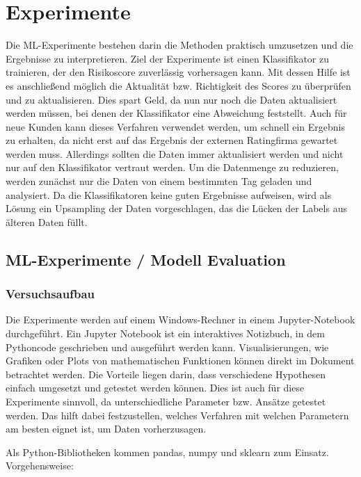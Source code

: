 \chapter{Experimente}\label{ch:experiments}
Die ML-Experimente bestehen darin die Methoden praktisch umzusetzen und die Ergebnisse zu interpretieren. 
Ziel der Experimente ist einen Klassifikator zu trainieren, der den Risikoscore zuverlässig vorhersagen kann. 
Mit dessen Hilfe ist es anschließend möglich die Aktualität bzw. Richtigkeit des Scores zu überprüfen und zu aktualisieren.
Dies spart Geld, da nun nur noch die Daten aktualisiert werden müssen, bei denen der Klassifikator eine Abweichung feststellt. 
Auch für neue Kunden kann dieses Verfahren verwendet werden, um schnell ein Ergebnis zu erhalten, da nicht erst auf das Ergebnis der externen Ratingfirma gewartet werden muss.
Allerdings sollten die Daten immer aktualisiert werden und nicht nur auf den Klassifikator vertraut werden. 
Um die Datenmenge zu reduzieren, werden zunächst nur die Daten von einem bestimmten Tag geladen und analysiert.
Da die Klassifikatoren keine guten Ergebnisse aufweisen, wird als Lösung ein Upsampling der Daten vorgeschlagen, das die Lücken der Labels aus älteren Daten füllt.


\section{ML-Experimente / Modell Evaluation }

\subsection{Versuchsaufbau}
Die Experimente werden auf einem Windows-Rechner in einem Jupyter-Notebook durchgeführt.
Ein Jupyter Notebook ist ein interaktives Notizbuch, in dem Pythoncode geschrieben und ausgeführt werden kann.
Visualisierungen, wie Grafiken oder Plots von mathematischen Funktionen können direkt im Dokument betrachtet werden. 
Die Vorteile liegen darin, dass verschiedene Hypothesen einfach umgesetzt und getestet werden können. 
Dies ist auch für diese Experimente sinnvoll, da unterschiedliche Parameter bzw. Ansätze getestet werden.
Das hilft dabei festzustellen, welches Verfahren mit welchen Parametern am besten eignet ist, um Daten vorherzusagen. 

Als Python-Bibliotheken kommen pandas, numpy und sklearn zum Einsatz. 
\\
Vorgehensweise: \\


